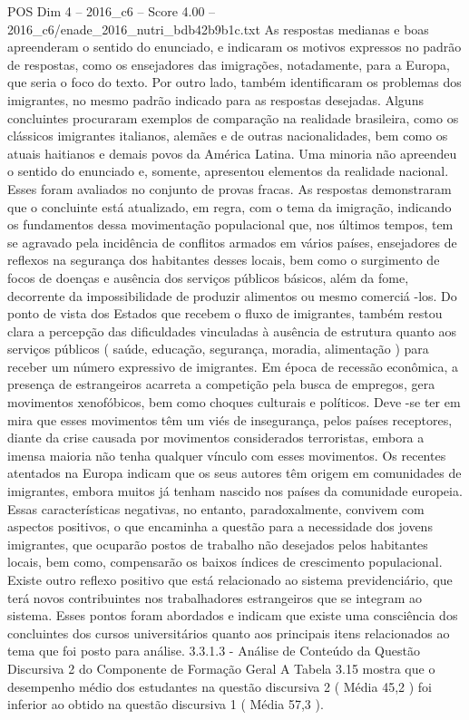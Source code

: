 \begin{textsample}{POS Dim 4 – 2016\_c6 – Score 4.00 – 2016\_c6/enade\_2016\_nutri\_bdb42b9b1c.txt}
As respostas medianas e boas apreenderam o sentido do enunciado, e indicaram os motivos expressos no padrão de respostas, como os ensejadores das imigrações, notadamente, para a Europa, que seria o foco do texto.
Por outro lado, também identificaram os problemas dos imigrantes, no mesmo padrão indicado para as respostas desejadas.
Alguns concluintes procuraram exemplos de comparação na realidade brasileira, como os clássicos imigrantes italianos, alemães e de outras nacionalidades, bem como os atuais haitianos e demais povos da América Latina.
Uma minoria não apreendeu o sentido do enunciado e, somente, apresentou elementos da realidade nacional.
Esses foram avaliados no conjunto de provas fracas.
As respostas demonstraram que o concluinte está atualizado, em regra, com o tema da imigração, indicando os fundamentos dessa movimentação populacional que, nos últimos tempos, tem se agravado pela incidência de conflitos armados em vários países, ensejadores de reflexos na segurança dos habitantes desses locais, bem como o surgimento de focos de doenças e ausência dos serviços públicos básicos, além da fome, decorrente da impossibilidade de produzir alimentos ou mesmo comerciá -los.
Do ponto de vista dos Estados que recebem o fluxo de imigrantes, também restou clara a percepção das dificuldades vinculadas à ausência de estrutura quanto aos serviços públicos ( saúde, educação, segurança, moradia, alimentação ) para receber um número expressivo de imigrantes.
Em época de recessão econômica, a presença de estrangeiros acarreta a competição pela busca de empregos, gera movimentos xenofóbicos, bem como choques culturais e políticos.
Deve -se ter em mira que esses movimentos têm um viés de insegurança, pelos países receptores, diante da crise causada por movimentos considerados terroristas, embora a imensa maioria não tenha qualquer vínculo com esses movimentos.
Os recentes atentados na Europa indicam que os seus autores têm origem em comunidades de imigrantes, embora muitos já tenham nascido nos países da comunidade europeia.
Essas características negativas, no entanto, paradoxalmente, convivem com aspectos positivos, o que encaminha a questão para a necessidade dos jovens imigrantes, que ocuparão postos de trabalho não desejados pelos habitantes locais, bem como, compensarão os baixos índices de crescimento populacional.
Existe outro reflexo positivo que está relacionado ao sistema previdenciário, que terá novos contribuintes nos trabalhadores estrangeiros que se integram ao sistema.
Esses pontos foram abordados e indicam que existe uma consciência dos concluintes dos cursos universitários quanto aos principais itens relacionados ao tema que foi posto para análise. 3.3.1.3 - Análise de Conteúdo da Questão Discursiva 2 do Componente de Formação Geral A Tabela 3.15 mostra que o desempenho médio dos estudantes na questão discursiva 2 ( Média 45,2 ) foi inferior ao obtido na questão discursiva 1 ( Média 57,3 ).

\end{textsample}
